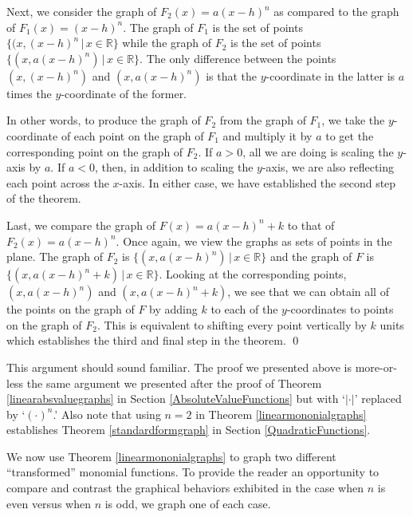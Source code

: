 \documentclass{ximera}
\begin{document}
\medskip

Next, we consider the graph of $F_{2}(x) = a(x-h)^n$ as compared to the graph of $F_{1}(x) = (x-h)^n$.  The graph of $F_{1}$ is the set of points $\{ (x, (x-h)^n \, | \, x \in \mathbb{R} \}$ while the graph of $F_{2}$ is the set of points $\{ (x, a(x-h)^n) \, | \, x \in \mathbb{R} \}$.  The only difference between the points $(x, (x-h)^n)$ and $(x, a(x-h)^n)$ is that the $y$-coordinate in the latter is $a$ times the $y$-coordinate of the former.  

\medskip

In other words, to produce the graph of $F_{2}$ from the graph of $F_{1}$, we take the $y$-coordinate of each point on the graph of $F_{1}$ and multiply it by $a$ to get the corresponding point on the graph of $F_{2}$.  If $a>0$, all we are doing is scaling the $y$-axis by $a$.  If $a<0$, then, in addition to scaling the $y$-axis, we are also reflecting each point across the $x$-axis.  In either case, we have established the second step of the theorem.

\medskip

Last, we compare the graph of $F(x) = a(x-h)^n + k$ to that of $F_{2}(x) = a(x-h)^n$.  Once again, we view the graphs as sets of points in the plane.  The graph of $F_{2}$ is $\{ (x, a(x-h)^n) \, | \, x \in \mathbb{R} \}$ and the graph of $F$ is$\{ (x, a(x-h)^n+k) \, | \, x \in \mathbb{R} \}$.  Looking at the corresponding points, $(x, a(x-h)^n)$ and $(x, a(x-h)^n+k)$, we see that we can obtain all of the points on the graph of $F$ by adding $k$ to each of the $y$-coordinates to points on the graph of $F_{2}$. This is equivalent to  shifting every point vertically by $k$ units which establishes the third and final step in the theorem. \qed

\medskip

This argument should sound familiar.  The proof we presented above is more-or-less the same argument we presented after the proof of Theorem \ref{linearabsvaluegraphs} in Section \ref{AbsoluteValueFunctions} but with `$| \cdot |$' replaced by `$(\cdot)^n$.'  Also note that using $n =2$ in Theorem \ref{linearmononialgraphs} establishes Theorem \ref{standardformgraph} in Section \ref{QuadraticFunctions}. 

\medskip

We now use Theorem \ref{linearmononialgraphs} to graph two different ``transformed'' monomial functions. To provide the reader an opportunity to compare and contrast the graphical behaviors exhibited in the case when $n$ is even versus when $n$ is odd, we graph one of each case.
\end{document}
